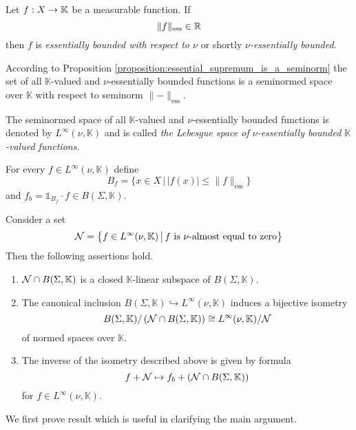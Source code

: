 \begin{definition}
    Let $f:X\rightarrow \mathbb{K}$ be a measurable function. If
    $$\lVert f \rVert_{\mathrm{ess}} \in {\mathbb R}$$
    then $f$ is \textit{essentially bounded with respect to $\nu$} or shortly \textit{$\nu$-essentially bounded}.
\end{definition}
\noindent
According to Proposition \ref{proposition:essential_supremum_is_a_seminorm} the set of all $\mathbb{K}$-valued and $\nu$-essentially bounded functions is a seminormed space over $\mathbb{K}$ with respect to seminorm $\lVert-\rVert_{\mathrm{ess}}$.

\begin{definition}
    The seminormed space of all $\mathbb{K}$-valued and $\nu$-essentially bounded functions is denoted by $L^{\infty}(\nu,\mathbb{K})$ and is called \textit{the Lebesgue space of $\nu$-essentially bounded $\mathbb{K}$-valued functions}.
\end{definition}
\noindent
For every $f \in L^{\infty}(\nu,\mathbb{K})$ define
$$B_f = \big\{x \in X\,\big|\,|f(x)| \leq \lVert f \rVert_{\mathrm{ess}}\big\}$$
and $f_b = \mathbb{1}_{B_f}\cdot f \in B(\Sigma,\mathbb{K})$.

\begin{theorem}\label{theorem:canonical_isometry_of_quotients}
    Consider a set
    $${\mathcal N} = \big\{f\in L^{\infty}(\nu,\mathbb{K})\,\big|\,f\mbox{ is $\nu$-almost equal to zero}\big\}$$
    Then the following assertions hold.
    \begin{enumerate}[label=\emph{\textbf{(\arabic*)}}, leftmargin=*]
        \item ${\mathcal N}\cap B(\Sigma,\mathbb{K})$ is a closed $\mathbb{K}$-linear subspace of $B(\Sigma, \mathbb{K})$.
        \item The canonical inclusion $B(\Sigma, \mathbb{K})\hookrightarrow L^{\infty}(\nu,\mathbb{K})$ induces a bijective isometry
              $$B(\Sigma,\mathbb{K})/\left({\mathcal N}\cap B(\Sigma,\mathbb{K})\right) \cong L^{\infty}(\nu,\mathbb{K})/{\mathcal N}$$
              of normed spaces over $\mathbb{K}$.
        \item The inverse of the isometry described above is given by formula
              $$f + {\mathcal N} \mapsto f_b + \left({\mathcal N} \cap B(\Sigma, \mathbb{K})\right)$$
              for $f \in L^{\infty}(\nu,\mathbb{K})$.
    \end{enumerate}
\end{theorem}
\noindent
We first prove result which is useful in clarifying the main argument.

